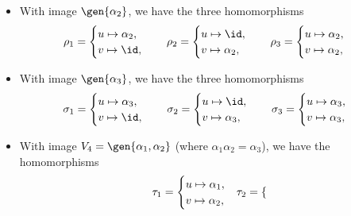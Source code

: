 \begin{solenum}[spsol]
\begin{itemize}
\begin{itemize}
\[            \]
            \item With image $\gen{\alpha_2}$, we have the three homomorphisms
            \[
            	\rho_1 = 
                \begin{cases}
                    u \mapsto \alpha_2, \\
                    v \mapsto \id,
                \end{cases} \quad
                \rho_2 =
                \begin{cases}
                    u \mapsto \id, \\
                    v \mapsto \alpha_2,
                \end{cases} \quad
                \rho_3 =
                \begin{cases}
                    u \mapsto \alpha_2, \\
                    v \mapsto \alpha_2,
                \end{cases}
            \]
            \item With image $\gen{\alpha_3}$, we have the three homomorphisms
            \[
            	\sigma_1 = 
                \begin{cases}
                    u \mapsto \alpha_3, \\
                    v \mapsto \id,
                \end{cases} \quad
                \sigma_2 =
                \begin{cases}
                    u \mapsto \id, \\
                    v \mapsto \alpha_3,
                \end{cases} \quad
                \sigma_3 =
                \begin{cases}
                    u \mapsto \alpha_3, \\
                    v \mapsto \alpha_3,
                \end{cases}
            \]
            \item With image $V_4 = \gen{\alpha_1, \alpha_2}$ (where $\alpha_1\alpha_2 = \alpha_3$), we have the homomorphisms
            \[
            	\tau_1 = 
                \begin{cases}
                    u \mapsto \alpha_1, \\
                    v \mapsto \alpha_2,
                \end{cases} \hspace{-2pt}
                \tau_2 =
                \begin{cases}

\end{cases}\]
\end{itemize}
\end{itemize}
\end{solenum}
